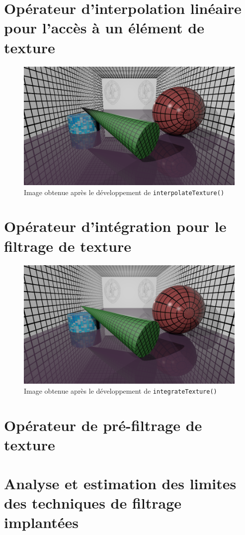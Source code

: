\documentclass[a4paper, 11pt]{article}
\begin{document}
	\section{Opérateur d'interpolation linéaire pour l'accès à un élément de texture}
	\begin{figure}[H]
		\centering
		\includegraphics[width=12cm]{2-monimage.png}
		\caption{Image obtenue après le développement de \texttt{interpolateTexture()}}
		\label{fig:fig1}
	\end{figure}
	\section{Opérateur d'intégration pour le filtrage de texture}
	\begin{figure}[H]
		\centering
		\includegraphics[width=12cm]{3-monimage.png}
		\caption{Image obtenue après le développement de \texttt{integrateTexture()}}
		\label{fig:fig1}
	\end{figure}
	\section{Opérateur de pré-filtrage de texture}

	\section{Analyse et estimation des limites des techniques de filtrage implantées}
\end{document}
